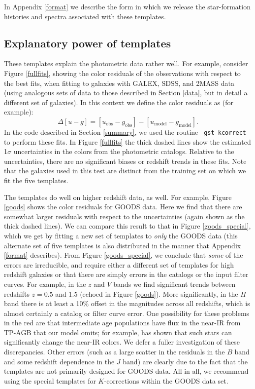 \documentclass[10pt,preprint]{aastex}
\begin{document}
In Appendix \ref{format} we describe the form in which we release the
star-formation histories and spectra associated with these templates.

\subsection{Explanatory power of templates}

These templates explain the photometric data rather well. For example,
consider Figure \ref{fullfits}, showing the color residuals of the
observations with respect to the best fits, when fitting to galaxies
with GALEX, SDSS, and 2MASS data (using analogous sets of data to 
those described in Section \ref{data}, but in detail a different
set of galaxies). In this context we define the color
residuals as (for example):
\begin{equation}
\Delta [u-g] = [u_{\mathrm{obs}}- g_{\mathrm{obs}}] -
[u_{\mathrm{model}}- g_{\mathrm{model}}] .
\end{equation}
In the code described in Section \ref{summary}, we used the routine {\tt
gst\_kcorrect} to perform these fits.  In Figure \ref{fullfits} the
thick dashed lines show the estimated 1$\sigma$ uncertainties in the
colors from the photometric catalogs. Relative to the uncertainties,
there are no significant biases or redshift trends in these fits. Note
that the galaxies used in this test are distinct from the training set
on which we fit the five templates.

The templates do well on higher redshift data, as well. For example,
Figure \ref{goods} shows the color residuals for GOODS data. Here we
find that there are somewhat larger residuals with respect to the
uncertainties (again shown as the thick dashed lines). We can compare
this result to that in Figure \ref{goods_special}, which we get by
fitting a new set of templates to {\it only} the GOODS data (this
alternate set of five templates is also distributed in the manner that
Appendix \ref{format} describes). From Figure \ref{goods_special}, we
conclude that {\it some} of the errors are irreducible, and require
either a different set of templates for high redshift galaxies or that
there are simply errors in the catalogs or the input filter
curves. For example, in the $z$ and $V$ bands we find significant
trends between redshifts $z=0.5$ and $1.5$ (echoed in Figure
\ref{goods}). More significantly, in the $H$ band there is at least a
10\% offset in the magnitudes across all redshifts, which is almost
certainly a catalog or filter curve error. One possibility for these
problems in the red are that intermediate age populations have flux in
the near-IR from TP-AGB that our model omits; for example,
\citet{maraston05a} has shown that such stars can significantly change
the near-IR colors. We defer a fuller investigation of these
discrepancies.  Other errors (such as a large scatter in the residuals
in the $B$ band and some redshift dependence in the $J$ band) are
clearly due to the fact that the templates are not primarily designed
for GOODS data. All in all, we recommend using the special templates
for $K$-corrections within the GOODS data set.
\end{document}
